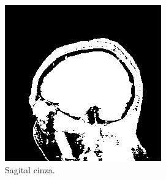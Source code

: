 \documentclass{article}
\begin{document}
\begin{figure}[H]
    \centering
    \begin{subfigure}[b]{0.3\textwidth}
        \includegraphics[width=\textwidth]{brain/radiologist-sagital-gray.png}
        \caption{Sagital cinza.}
    \end{subfigure}
    ~
    \begin{subfigure}[b]{0.3\textwidth}

\end{subfigure}
\end{figure}
\end{document}
